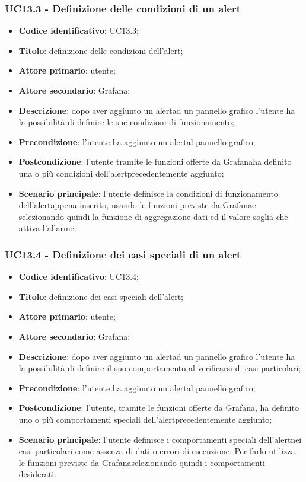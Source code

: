 \subsubsection{UC13.3 - Definizione delle condizioni di un alert}
\begin{itemize}
	\item \textbf{Codice identificativo}: UC13.3;
	\item \textbf{Titolo}: definizione delle condizioni dell'alert\glo;
	\item \textbf{Attore primario}: utente;
	\item \textbf{Attore secondario}: Grafana\glo;
	\item \textbf{Descrizione}: dopo aver aggiunto un alert\glosp ad un pannello grafico l'utente ha la possibilità di definire le sue condizioni di funzionamento;
	\item \textbf{Precondizione}: l'utente ha aggiunto un alert\glosp al pannello grafico;
	\item \textbf{Postcondizione}: l'utente tramite le funzioni offerte da Grafana\glosp ha definito una o più condizioni dell'alert\glosp precedentemente aggiunto;
	\item \textbf{Scenario principale}: l'utente definisce la condizioni di funzionamento dell'alert\glosp appena inserito, usando le funzioni previste da Grafana\glosp e selezionando quindi la funzione di aggregazione dati ed il valore soglia che attiva l'allarme.
\end{itemize}

\subsubsection{UC13.4 - Definizione dei casi speciali di un alert}
	\begin{itemize}
	\item \textbf{Codice identificativo}: UC13.4;
	\item \textbf{Titolo}: definizione dei casi speciali dell'alert\glo;
	\item \textbf{Attore primario}: utente;
	\item \textbf{Attore secondario}: Grafana\glo;
	\item \textbf{Descrizione}: dopo aver aggiunto un alert\glosp ad un pannello grafico l'utente ha la possibilità di definire il suo comportamento al verificarsi di casi particolari;
	\item \textbf{Precondizione}: l'utente ha aggiunto un alert\glosp al pannello grafico;
	\item \textbf{Postcondizione}: l'utente, tramite le funzioni offerte da Grafana\glosp, ha definito uno o più comportamenti speciali dell'alert\glosp precedentemente aggiunto;
	\item \textbf{Scenario principale}: l'utente definisce i comportamenti speciali dell'alert\glosp nei casi particolari come assenza di dati o errori di esecuzione. Per farlo utilizza le funzioni previste da Grafana\glosp selezionando quindi i comportamenti desiderati.
\end{itemize} 